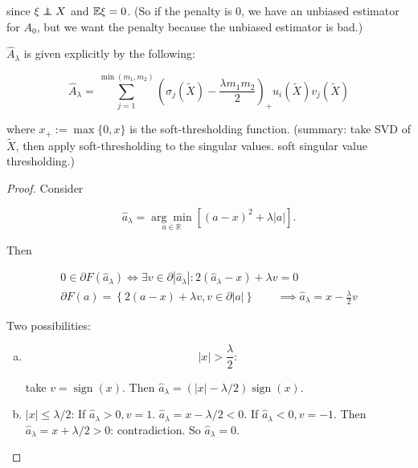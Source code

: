 \begin{example}
since \(\xi \indep X\) and \(\mathbb{E} \xi = 0\). (So if the penalty is 0, we have an unbiased estimator for \(A_0\), but we want the penalty because the unbiased estimator is bad.)

\begin{theorem}

\(\hat{A}_\lambda\) is given explicitly by the following:

\[
\hat{A}_\lambda = \sum_{j=1}^{\min(m_1, m_2)} \left(  \sigma_j(\tilde{X}) - \frac{\lambda m_1 m_2}{2}  \right)_+ u_i(\tilde{X}) v_j(\tilde{X}) 
\]

where \(x_+ := \max\{0, x\}\) is the soft-thresholding function. (summary: take SVD of \(\tilde{X}\), then apply soft-thresholding to the singular values. soft singular value thresholding.) 

\end{theorem}

\begin{proof}

Consider 

\[
\hat{a}_\lambda = \underset{a \in \mathbb{R}}{\arg \min} \left[ (a - x)^2 + \lambda |a| \right].
\]

Then

\begin{multline*}
0 \in \partial F(\hat{a}_\lambda) \iff \exists v \in \partial | \hat{a}_\lambda|: 2(\hat{a}_\lambda - x) + \lambda v = 0
\\ \partial F(a) = \left\{2(a - x) + \lambda  v, v \in \partial |a| \right\}
\qquad \implies \hat{a}_\lambda = x - \frac{\lambda}{2} v
\end{multline*}

Two possibilities:

\begin{enumerate}[(a)]


\item 

\[
|x| > \frac{\lambda}{2}:
\]

take \(v = \operatorname{sign}(x)\). Then \(\hat{a}_\lambda = (|x| - \lambda/2)  \operatorname{sign}(x)\). 

\item \(|x| \leq \lambda/2\): If \(\hat{a}_\lambda > 0, v = 1\). \(\hat{a}_\lambda = x - \lambda/2 < 0\). If \(\hat{a}_\lambda < 0, v = -1\). Then \(\hat{a}_\lambda = x + \lambda/2 > 0\): contradiction. So \(\hat{a}_\lambda = 0\).  

\end{enumerate}


\end{proof}
\end{example}
